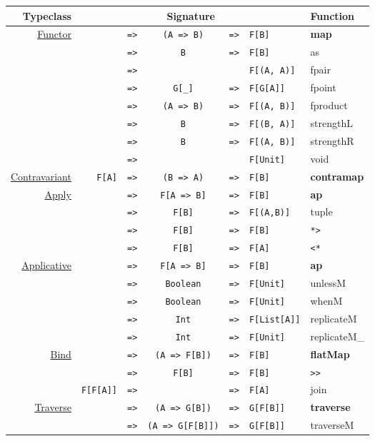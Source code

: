 \documentclass{tufte-handout}
\newcommand{\fa}{F[A]}
\newcommand{\fb}{F[B]}
\newcommand{\rarr}{\texttt{=>}}
\newcommand{\fTwo}[2]{\texttt{#1} & \rarr & & & \texttt{#2}}
\newcommand{\fThree}[3]{\texttt{#1} & \rarr & \texttt{#2} & \rarr & \texttt{#3}}
\newcommand{\sdocUrl}[1]{http://docs.typelevel.org/api/scalaz/stable/7.0.4/doc/\#scalaz.#1}
\newcommand{\sdocHref}[1]{\href{\sdocUrl{#1}}{#1}}
\begin{document}
\begin{table}[ht]
  \centering
  \selectfont
  \begin{tabular}{rrcclll}
    Typeclass & \multicolumn{5}{c}{Signature} & Function \\
    \midrule
    \multirow{8}{*}{\sdocHref{Functor}}
      & \fThree{\multirow{8}{*}{\fa}}{(A => B)}{\fb} & \textbf{map} \\
      & \fThree{}{B}{\fb} & as \\
      & \fTwo{}{F[(A, A)]} & fpair \\
      & \fThree{}{G[\_]}{F[G[A]]} & fpoint \\
      & \fThree{}{(A => B)}{F[(A, B)]} & fproduct \\
      & \fThree{}{B}{F[(B, A)]} & strengthL \\
      & \fThree{}{B}{F[(A, B)]} & strengthR \\
      & \fTwo{}{F[Unit]} & void \\[.5cm]
    \sdocHref{Contravariant} & \fThree{\fa}{(B => A)}{\fb} & \textbf{contramap} \\[.5cm]
    \multirow{4}{*}{\sdocHref{Apply}\footnotemark[3]}
      & \fThree{\multirow{4}{*}{\fa}}{F[A => B]}{\fb} & \textbf{ap} \\
      & \fThree{}{\fb}{F[(A,B)]} & tuple \\
      & \fThree{}{\fb}{\fb} & \verb$*>$ \\
      & \fThree{}{\fb}{\fa} & \verb$<*$ \\[.5cm]
    \multirow{5}{*}{\sdocHref{Applicative}}
      & \fThree{\multirow{5}{*}{\fa}}{F[A => B]}{\fb} & \textbf{ap} \\
      & \fThree{}{Boolean}{F[Unit]} & unlessM \\
      & \fThree{}{Boolean}{F[Unit]} & whenM \\
      & \fThree{}{Int}{F[List[A]]} & replicateM \\
      & \fThree{}{Int}{F[Unit]} & replicateM\_ \\[.5cm]
    \multirow{2}{*}{\sdocHref{Bind}}
      & \fThree{\multirow{2}{*}{\fa}}{(A => F[B])}{\fb} & \textbf{flatMap} \\
      & \fThree{}{\fb}{\fb} & \verb$>>$ \\
      & \fThree{F[F[A]]}{}{\fa} & join \\[.5cm]
    \multirow{6}{*}{\sdocHref{Traverse}}
      & \fThree{\multirow{5}{*}{\fa}}{(A => G[B])}{G[F[B]]} & \textbf{traverse} \\
      & \fThree{}{(A => G[F[B]])}{G[F[B]]} & traverseM \\

\end{tabular}
\end{table}
\end{document}
